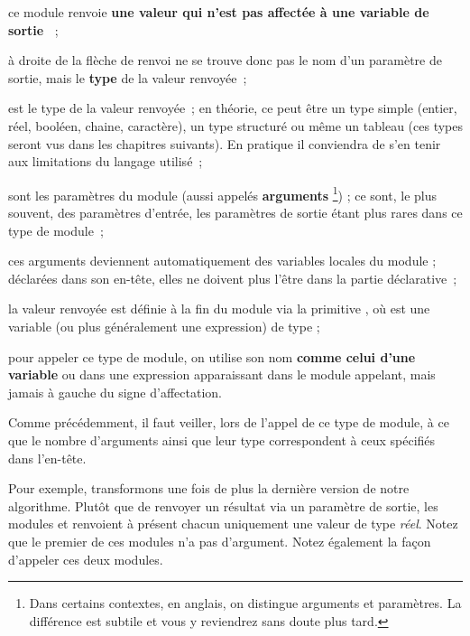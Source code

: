 	\begin{liste}
	\item 
		ce module renvoie 
		\textbf{une valeur qui n’est pas affectée à une variable de sortie~} ;
	\item 
		à droite de la flèche de renvoi ne se trouve donc pas 
		le nom d’un paramètre de sortie, 
		mais le \textbf{type} de la valeur renvoyée~;
	\item
		 est le type de la valeur renvoyée~; 
		en théorie, ce peut être un type simple 
		(entier, réel, booléen, chaine, caractère), 
		un type structuré ou même un tableau 
		(ces types seront vus dans les chapitres suivants). 
		En pratique il conviendra de s’en tenir aux limitations 
		du langage utilisé~;
	\item
		sont les paramètres du module 
		(aussi appelés \textbf{arguments}%
		\footnote{%
			Dans certains contextes, en anglais, 
			on distingue arguments et paramètres. 
			La différence est subtile 
			et vous y reviendrez sans doute plus tard.
		}) ; 
		ce sont, le plus souvent, des paramètres d’entrée, 
		les paramètres de sortie étant plus rares 
		dans ce type de module~;
	\item
		ces arguments deviennent automatiquement 
		des variables locales du module ; 
		déclarées dans son en-tête, 
		elles ne doivent plus l’être dans la partie déclarative~;
	\item 
		la valeur renvoyée est définie à la fin du module 
		via la primitive ,
		où  est une variable 
		(ou plus généralement une expression) 
		de type  ;
	\item
		pour appeler ce type de module, 
		on utilise son nom \textbf{comme celui
		d’une variable} ou dans une expression apparaissant 
		dans le module appelant, 
		mais jamais à gauche du signe d’affectation.
	\end{liste}

	Comme précédemment, il faut veiller, lors de l’appel de ce 
	type de module, à ce que le nombre d’arguments ainsi que leur type
	correspondent à ceux spécifiés dans l’en-tête.

	Pour exemple, transformons une fois de plus la
	dernière version de notre algorithme.
	Plutôt que de renvoyer un résultat via un paramètre de sortie, 
	les modules  et
	 renvoient à présent 
	chacun uniquement une valeur de type \textit{réel}.
	Notez que le premier de ces modules n’a pas d’argument.
	Notez également la façon d’appeler ces deux modules.

